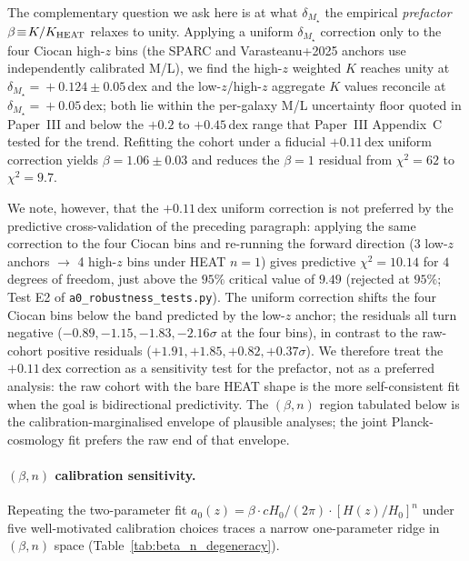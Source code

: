 \documentclass[twocolumn,letterpaper]{aastex631}
\newcommand{\azero}{a_0}
\begin{document}
The complementary question we ask here is at what
$\delta_{M_{\star}}$ the empirical \emph{prefactor}
$\beta\!\equiv\!K/K_{\rm HEAT}$ relaxes to unity.  Applying a
uniform $\delta_{M_{\star}}$ correction only to the four
Ciocan high-$z$ bins (the SPARC and Varasteanu+2025 anchors use
independently calibrated M/L), we find the high-$z$ weighted
$K$ reaches unity at
$\delta_{M_{\star}}\!=\!+0.124\!\pm\!0.05$\,dex and the
low-$z$/high-$z$ aggregate $K$ values reconcile at
$\delta_{M_{\star}}\!=\!+0.05$\,dex; both lie within the
per-galaxy M/L uncertainty floor quoted in Paper~III and below
the $+0.2$ to $+0.45$\,dex range that Paper~III Appendix~C
tested for the trend.  Refitting the cohort under a fiducial
$+0.11$\,dex uniform correction yields
$\beta\!=\!1.06\!\pm\!0.03$ and reduces the
$\beta\!=\!1$ residual from $\chi^{2}\!=\!62$ to
$\chi^{2}\!=\!9.7$.

We note, however, that the $+0.11$\,dex uniform correction is
not preferred by the predictive cross-validation of the
preceding paragraph: applying the same correction to the four
Ciocan bins and re-running the forward direction
(3 low-$z$ anchors $\to$ 4 high-$z$ bins under HEAT $n\!=\!1$)
gives predictive $\chi^{2}\!=\!10.14$ for $4$ degrees of
freedom, just above the $95\%$ critical value of $9.49$
(rejected at $95\%$; Test E2 of
\texttt{a0\_robustness\_tests.py}).  The uniform correction
shifts the four Ciocan bins below the band predicted by the
low-$z$ anchor; the residuals all turn negative
($-0.89, -1.15, -1.83, -2.16\sigma$ at the four bins), in
contrast to the raw-cohort positive residuals
($+1.91, +1.85, +0.82, +0.37\sigma$).  We therefore treat the
$+0.11$\,dex correction as a sensitivity test for the
prefactor, not as a preferred analysis: the raw cohort with
the bare HEAT shape is the more self-consistent fit when the
goal is bidirectional predictivity.  The
$(\beta, n)$ region tabulated below is the
calibration-marginalised envelope of plausible analyses; the
joint Planck-cosmology fit prefers the raw end of that
envelope.

\paragraph{$(\beta,n)$ calibration sensitivity.}  Repeating the
two-parameter fit
$\azero(z)\!=\!\beta\!\cdot\!cH_0/(2\pi)\!\cdot\![H(z)/H_0]^{n}$
under five well-motivated calibration choices traces a narrow
one-parameter ridge in $(\beta,n)$ space (Table~\ref{tab:beta_n_degeneracy}).
\end{document}
